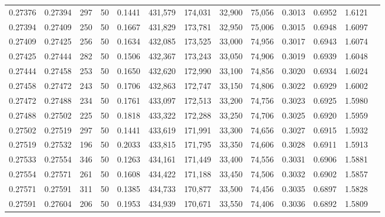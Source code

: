 \begin{tabular}{rrrrrrrrrrrrr}
0.27376 & 0.27394 &   297 &  50 &                                     0.1441 & 431,579 & 174,031 &  32,900 &  75,056 & 0.3013 & 0.6952 & 1.6121 \\
0.27394 & 0.27409 &   250 &  50 &                                     0.1667 & 431,829 & 173,781 &  32,950 &  75,006 & 0.3015 & 0.6948 & 1.6097 \\
0.27409 & 0.27425 &   256 &  50 &                                     0.1634 & 432,085 & 173,525 &  33,000 &  74,956 & 0.3017 & 0.6943 & 1.6074 \\
0.27425 & 0.27444 &   282 &  50 &                                     0.1506 & 432,367 & 173,243 &  33,050 &  74,906 & 0.3019 & 0.6939 & 1.6048 \\
0.27444 & 0.27458 &   253 &  50 &                                     0.1650 & 432,620 & 172,990 &  33,100 &  74,856 & 0.3020 & 0.6934 & 1.6024 \\
0.27458 & 0.27472 &   243 &  50 &                                     0.1706 & 432,863 & 172,747 &  33,150 &  74,806 & 0.3022 & 0.6929 & 1.6002 \\
0.27472 & 0.27488 &   234 &  50 &                                     0.1761 & 433,097 & 172,513 &  33,200 &  74,756 & 0.3023 & 0.6925 & 1.5980 \\
0.27488 & 0.27502 &   225 &  50 &                                     0.1818 & 433,322 & 172,288 &  33,250 &  74,706 & 0.3025 & 0.6920 & 1.5959 \\
0.27502 & 0.27519 &   297 &  50 &                                     0.1441 & 433,619 & 171,991 &  33,300 &  74,656 & 0.3027 & 0.6915 & 1.5932 \\
0.27519 & 0.27532 &   196 &  50 &                                     0.2033 & 433,815 & 171,795 &  33,350 &  74,606 & 0.3028 & 0.6911 & 1.5913 \\
0.27533 & 0.27554 &   346 &  50 &                                     0.1263 & 434,161 & 171,449 &  33,400 &  74,556 & 0.3031 & 0.6906 & 1.5881 \\
0.27554 & 0.27571 &   261 &  50 &                                     0.1608 & 434,422 & 171,188 &  33,450 &  74,506 & 0.3032 & 0.6902 & 1.5857 \\
0.27571 & 0.27591 &   311 &  50 &                                     0.1385 & 434,733 & 170,877 &  33,500 &  74,456 & 0.3035 & 0.6897 & 1.5828 \\
0.27591 & 0.27604 &   206 &  50 &                                     0.1953 & 434,939 & 170,671 &  33,550 &  74,406 & 0.3036 & 0.6892 & 1.5809 \\

\end{tabular}
